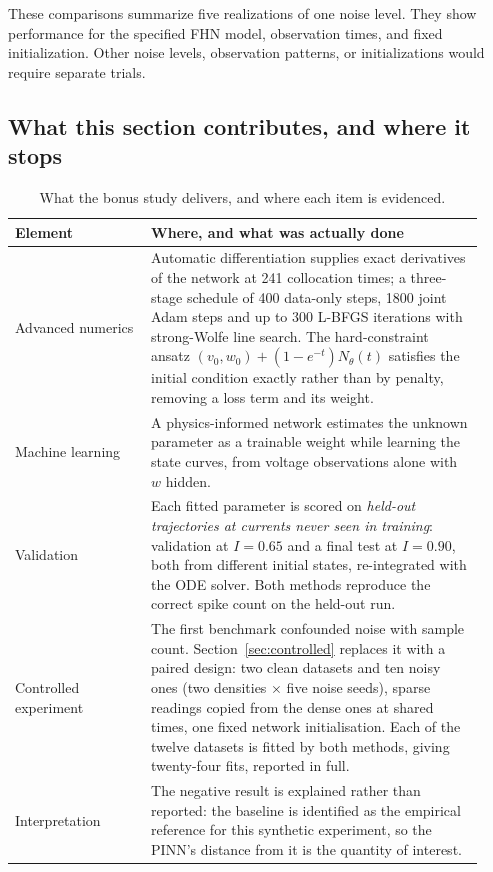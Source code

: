 These comparisons summarize five realizations of one noise level. They show performance for the specified FHN model, observation times, and fixed initialization. Other noise levels, observation patterns, or initializations would require separate trials.

\clearpage

\subsection{What this section contributes, and where it stops}
\label{sec:bonus-value}

\begin{table}[H]
  \centering
  \caption{What the bonus study delivers, and where each item is evidenced.}
  \label{tab:bonus-map}
  \small
  \begin{tabular}{@{}p{0.27\linewidth}p{0.66\linewidth}@{}}
    \toprule
    Element & Where, and what was actually done\\
    \midrule
    Advanced numerics &
      Automatic differentiation supplies exact derivatives of the network at 241 collocation
      times; a three-stage schedule of 400 data-only steps, 1800 joint Adam steps and up to 300
      L-BFGS iterations with strong-Wolfe line search. The hard-constraint ansatz
      \((v_0,w_0)+(1-e^{-t})N_\theta(t)\) satisfies the initial condition exactly rather than by
      penalty, removing a loss term and its weight.\\[0.35em]
    Machine learning &
      A physics-informed network estimates the unknown parameter as a trainable weight while
      learning the state curves, from voltage observations alone with \(w\) hidden.\\[0.35em]
    Validation &
      Each fitted parameter is scored on \emph{held-out trajectories at currents never seen in
      training}: validation at \(I=0.65\) and a final test at \(I=0.90\), both from different
      initial states, re-integrated with the ODE solver. Both methods reproduce the correct spike
      count on the held-out run.\\[0.35em]
    Controlled experiment &
      The first benchmark confounded noise with sample count. Section~\ref{sec:controlled}
      replaces it with a paired design: two clean datasets and ten noisy ones (two densities
      \(\times\) five noise seeds), sparse readings copied from the dense ones at shared times,
      one fixed network initialisation. Each of the twelve datasets is fitted by both methods,
      giving twenty-four fits, reported in full.\\[0.35em]
    Interpretation &
      The negative result is explained rather than reported: the baseline is identified as the
      empirical reference for this synthetic experiment, so the PINN's distance from it is
      the quantity of interest.\\
    \bottomrule
  \end{tabular}
\end{table}

